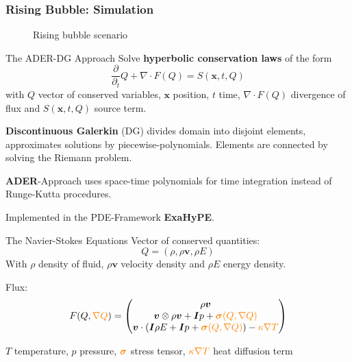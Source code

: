 \documentclass{beamer}
\newcommand{\Qrho}{\ensuremath{\rho}}
\newcommand{\Qj}{\ensuremath{\rho \bm{v}}}
\newcommand{\Qv}{\ensuremath{\bm{v}}}
\newcommand{\QE}{\ensuremath{\rho E}}
\newcommand{\stressT}{\ensuremath{\bm{\sigma}}}
\newcommand{\pressure}{\ensuremath{p}}
\begin{document}
\begin{frame}
  \frametitle{Rising Bubble: Simulation}
   \begin{figure}[h]
    \centering
    \caption{Rising bubble scenario}
  \end{figure}
\end{frame}

\begin{frame}{The ADER-DG Approach}
  Solve \textbf{hyperbolic conservation laws} of the form
\begin{equation}
  \label{eq:conservation-law}
 \frac{\partial}{\partial_t}  Q + \nabla \cdot F(Q) = S(\bm{x}, t, Q)
\end{equation}
with $Q$ vector of conserved variables, $\bm{x}$ position, $t$ time,  $\nabla \cdot F(Q)$ divergence of flux and $S(\bm{x}, t, Q)$ source term.

\textbf{Discontinuous Galerkin} (\textsc{DG}) divides domain into disjoint elements, approximates solutions by piecewise-polynomials.
Elements are connected by solving the Riemann problem.

\textbf{ADER}-Approach uses space-time polynomials for time integration instead of Runge-Kutta procedures.

Implemented in the \textsc{PDE}-Framework \textbf{ExaHyPE}.
\end{frame}

\begin{frame}{The Navier-Stokes Equations}
  Vector of conserved quantities:
\begin{equation}
  \label{eq:conserved-variables}
 Q = \left( \Qrho, \Qj, \QE \right) 
\end{equation}
With $\Qrho$ density of fluid, $\Qj$ velocity density and $\QE$ energy density.

Flux:
\begin{equation}
  F(Q, \textcolor{orange}{\nabla Q}) = 
  \begin{pmatrix}
    \Qj \\
    \Qv  \otimes \Qj + \bm{I} \pressure + \textcolor{orange}{\stressT (Q, \nabla Q)}  \\
    \Qv \cdot \left(\bm{I} \QE + \bm{I} \pressure + \textcolor{orange}{\stressT (Q, \nabla Q)} \right) -
    \textcolor{orange}{\kappa \nabla T}
  \end{pmatrix}
\end{equation}

$T$ temperature, $\pressure$ pressure,
$\textcolor{orange}{\stressT}$ stress tensor, $\textcolor{orange}{\kappa \nabla T}$ heat diffusion term
\end{frame}
\end{document}
